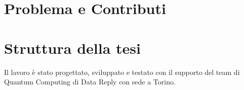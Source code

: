 \section[Problema e Contributi]{Problema e Contributi}

\section[Struttura della tesi]{Struttura della tesi}









Il lavoro è stato progettato, sviluppato e testato con il supporto del team di Quantum Computing di Data Reply con sede a Torino. 


